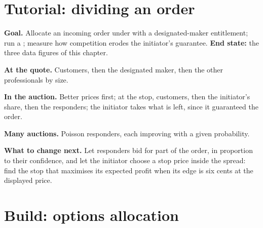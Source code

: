 \section{Tutorial: dividing an order}\label{tut:m1:options-market-structure:alloc}

\begin{tutorial}
\textbf{Goal.} Allocate an incoming order under  with a
designated-maker entitlement; run a ; measure how
competition erodes the initiator's guarantee. \textbf{End state:} the three
data figures of this chapter.
\begin{tutsteps}
\item \textbf{At the quote.} Customers, then the designated maker, then the
other professionals by size.
\label{lst:m1:options-market-structure:alloc}
\item \textbf{In the auction.} Better prices first; at the stop, customers,
then the initiator's share, then the responders; the initiator takes what is
left, since it guaranteed the order.
\label{lst:m1:options-market-structure:auction}
\item \textbf{Many auctions.} Poisson responders, each improving with a
given probability.
\end{tutsteps}
\textbf{What to change next.} Let responders bid for part of the order, in
proportion to their confidence, and let the initiator choose a stop price
inside the spread: find the stop that maximises its expected profit when its
edge is six cents at the displayed price.
\end{tutorial}

\section{Build: options allocation}\label{bld:m1:options-market-structure:optmatch}


